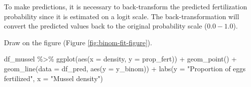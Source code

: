 \documentclass[
]{article}
\newenvironment{Shaded}{\begin{snugshade}}{\end{snugshade}}
\newcommand{\AttributeTok}[1]{\textcolor[rgb]{0.77,0.63,0.00}{#1}}
\newcommand{\CommentTok}[1]{\textcolor[rgb]{0.56,0.35,0.01}{\textit{#1}}}
\newcommand{\DecValTok}[1]{\textcolor[rgb]{0.00,0.00,0.81}{#1}}
\newcommand{\FunctionTok}[1]{\textcolor[rgb]{0.00,0.00,0.00}{#1}}
\newcommand{\NormalTok}[1]{#1}
\newcommand{\OtherTok}[1]{\textcolor[rgb]{0.56,0.35,0.01}{#1}}
\newcommand{\SpecialCharTok}[1]{\textcolor[rgb]{0.00,0.00,0.00}{#1}}
\newcommand{\StringTok}[1]{\textcolor[rgb]{0.31,0.60,0.02}{#1}}
\begin{document}
To make predictions, it is necessary to back-transform the predicted fertilization probability since it is estimated on a logit scale. The back-transformation will convert the predicted values back to the original probability scale (\(0.0-1.0\)).

\begin{Shaded}
\end{Shaded}

Draw on the figure (Figure \ref{fig:binom-fit-figure}).

\begin{Shaded}
\begin{Highlighting}[]
\NormalTok{df\_mussel }\SpecialCharTok{\%\textgreater{}\%} 
  \FunctionTok{ggplot}\NormalTok{(}\FunctionTok{aes}\NormalTok{(}\AttributeTok{x =}\NormalTok{ density,}
             \AttributeTok{y =}\NormalTok{ prop\_fert)) }\SpecialCharTok{+}
  \FunctionTok{geom\_point}\NormalTok{() }\SpecialCharTok{+}
  \FunctionTok{geom\_line}\NormalTok{(}\AttributeTok{data =}\NormalTok{ df\_pred,}
            \FunctionTok{aes}\NormalTok{(}\AttributeTok{y =}\NormalTok{ y\_binom)) }\SpecialCharTok{+}
  \FunctionTok{labs}\NormalTok{(}\AttributeTok{y =} \StringTok{"Proportion of eggs fertilized"}\NormalTok{,}
       \AttributeTok{x =} \StringTok{"Mussel density"}\NormalTok{)}
\end{Highlighting}
\end{Shaded}
\end{document}
